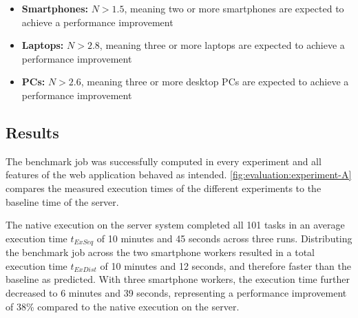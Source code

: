 \begin{itemize}
    \item \textbf{Smartphones:} $N > 1.5$, meaning two or more smartphones are expected to achieve a performance improvement 
    \item \textbf{Laptops:} $N > 2.8$, meaning three or more laptops are expected to achieve a performance improvement
    \item \textbf{PCs:} $N > 2.6$, meaning three or more desktop \ac{PC}s are expected to achieve a performance improvement
\end{itemize}

\subsection{Results}
The benchmark job was successfully computed in every experiment and all features of the web application behaved as intended. \autoref{fig:evaluation:experiment-A} compares the measured execution times of the different experiments to the baseline time of the server.

The native execution on the server system completed all 101 tasks in an average execution time $t_{ExSeq}$ of 10 minutes and 45 seconds across three runs. Distributing the benchmark job across the two smartphone workers resulted in a total execution time $t_{ExDist}$ of 10 minutes and 12 seconds, and therefore faster than the baseline as predicted. With three smartphone workers, the execution time further decreased to 6 minutes and 39 seconds, representing a performance improvement of 38\% compared to the native execution on the server.

